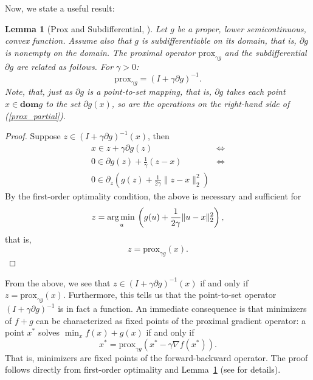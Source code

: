 \documentclass[11pt, twoside]{report}
\newtheorem{lemma}[theorem]{Lemma}
\begin{document}
Now, we state a useful result:
\begin{lemma}[Prox and Subdifferential, \cite{proxalgs}] \label{prox_subdif}
Let $g$ be a proper, lower semicontinuous, convex function. Assume also that $g$ is subdifferentiable on its domain, that is, $\partial g$ is nonempty on the domain. The proximal operator $\mathrm{prox}_{\gamma g}$ and the subdifferential $\partial g$ are related as follows. For $\gamma > 0$:
\begin{equation} \label{prox_partial}
    \mathrm{prox}_{\gamma g} = (I + \gamma \partial g)^{-1}.
\end{equation}
Note, that, just as $\partial g$ is a point-to-set mapping, that is, $\partial g$ takes each point $x \in \mathbf{dom}g$ to the set $\partial g (x)$, so are the operations on the right-hand side of (\ref{prox_partial}).
\end{lemma}
\begin{proof}
Suppose $z \in (I + \gamma \partial g)^{-1}(x)$, then
\begin{align*}
  x \in z + \gamma \partial g(z) &\iff \\
  0 \in \partial g(z) + \frac{1}{\gamma}(z-x) &\iff \\
  0 \in \partial_z \left(g(z) + \frac{1}{2\gamma} \|z-x\|_2^2 \right)
\end{align*}
By the first-order optimality condition, the above is necessary and sufficient for
\[z = \operatorname*{arg\, min \,}_u \left(g(u) + \frac{1}{2\gamma}\|u-x\|_2^2 \right),\]
that is,
\[z = \mathrm{prox}_{\gamma g}(x).\]
\end{proof}
From the above, we see that $z \in (I + \gamma \partial g)^{-1}(x)$ if and only if $z = \mathrm{prox}_{\gamma g}(x).$ Furthermore, this tells us that the point-to-set operator $(I + \gamma \partial g)^{-1}$ is in fact a function. An immediate consequence is that minimizers of $f+g$ can be characterized as fixed points of the proximal gradient operator: a point $x^*$ solves $\min_x f(x)+g(x)$ if and only if
\[
x^* = \mathrm{prox}_{\gamma g}\!\left(x^* - \gamma \nabla f(x^*)\right).
\]
That is, minimizers are fixed points of the forward-backward operator. The proof follows directly from first-order optimality and Lemma~\ref{prox_subdif} (see \cite{proxalgs} for details).  
\end{document}
